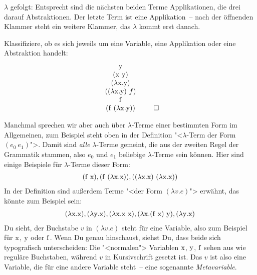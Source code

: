 $\lambda$ gefolgt: Entsprecht sind die nächsten beiden Terme
Applikationen, die drei darauf Abstraktionen.  Der letzte Term ist
eine Applikation~-- nach der öffnenden Klammer steht ein weitere
Klammer, das $\lambda$ kommt erst danach.
%
\begin{aufgabe}
  Klassifiziere, ob es sich jeweils um eine
  Variable, eine Applikation oder eine Abstraktion handelt:
  \begin{displaymath}
  \begin{array}[b]{c}
      \lrm y\\
      (\lrm x~\lrm y)\\
      (\lambda \lrm x.\lrm y)\\
      ((\lambda \lrm x.\lrm y)~f)\\
      \lrm f\\
      (\lrm f~(\lambda \lrm x.\lrm y))
  \end{array}\tag*{$\square$} %
  \end{displaymath}
\end{aufgabe}
% 
Manchmal sprechen wir aber auch über
$\lambda$-Terme einer bestimmten Form im Allgemeinen, zum Beispiel
steht oben in der Definition "<$\lambda$-Term der Form
$(e_0~e_1)$">. Damit sind \emph{alle} $\lambda$-Terme gemeint, die aus der
zweiten Regel der Grammatik stammen, also $e_0$ und $e_1$ beliebige
$\lambda$-Terme sein können.  Hier sind einige Beispiele für
$\lambda$-Terme dieser Form:
%
\begin{displaymath}
  \begin{array}{c}
    (\mathrm f~\mathrm x),
    (\mathrm f~(\lambda \mathrm x.\mathrm x)),
    ((\lambda \mathrm x.\mathrm x)~(\lambda \mathrm x.\mathrm x))
  \end{array}
\end{displaymath}
%
In der Definition sind außerdem Terme "<der Form $(\lambda v.e)$">
erwähnt, das könnte zum Beispiel sein:
%
\begin{displaymath}
  \begin{array}{c}
    (\lambda \mathrm x.\mathrm x),
    (\lambda \mathrm y.\mathrm x),
    (\lambda \mathrm x.\mathrm x~\mathrm x),
    (\lambda \mathrm x.(\mathrm f~\mathrm x)~\mathrm y),
    (\lambda \mathrm y.\mathrm x)
  \end{array}
\end{displaymath}
%
Du sieht, der Buchstabe $v$ in $(\lambda v.e)$ steht für eine Variable,
also zum Beispiel für $\mathrm x$, $\mathrm y$ oder $\mathrm f$.  Wenn Du genau hinschaust,
siehst Du, dass beide sich typografisch unterscheiden: Die
"<normalen"> Variablen $\mathrm x$, $\mathrm y$, $\mathrm f$ sehen aus wie
reguläre Buchstaben, während $v$ in Kursivschrift gesetzt ist.
Das $v$ ist also eine Variable, die für eine andere Variable steht~--
eine sogenannte \textit{Metavariable}.

